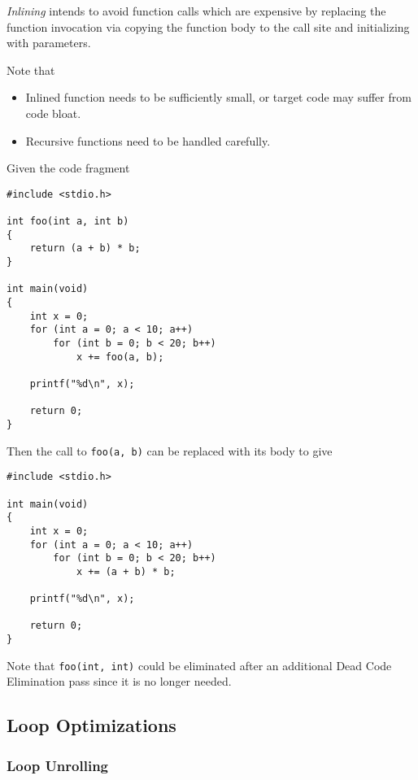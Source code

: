 \begin{definition}[Inlining]
    \textit{Inlining} intends to avoid function calls which are expensive by replacing the function invocation via copying the function body to the call site and initializing with parameters.
    
    Note that
    \begin{itemize}
        \item Inlined function needs to be sufficiently small, or target code may suffer from code bloat.
        \item Recursive functions need to be handled carefully.
    \end{itemize}
\end{definition}

\begin{example}
    Given the code fragment
    \begin{verbatim}
#include <stdio.h>

int foo(int a, int b)
{
    return (a + b) * b;
}

int main(void)
{
    int x = 0;
    for (int a = 0; a < 10; a++)
        for (int b = 0; b < 20; b++)
            x += foo(a, b);
            
    printf("%d\n", x);

    return 0;
}
    \end{verbatim}
    
    Then the call to \texttt{foo(a, b)} can be replaced with its body to give
    \begin{verbatim}
#include <stdio.h>

int main(void)
{
    int x = 0;
    for (int a = 0; a < 10; a++)
        for (int b = 0; b < 20; b++)
            x += (a + b) * b;
            
    printf("%d\n", x);

    return 0;
}
    \end{verbatim}
    
    Note that \texttt{foo(int, int)} could be eliminated after an additional Dead Code Elimination pass since it is no longer needed.
\end{example}

\subsection{Loop Optimizations}

\subsubsection{Loop Unrolling}

